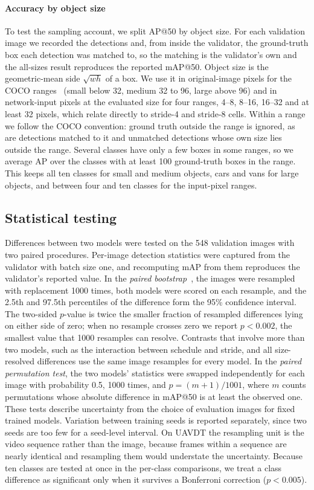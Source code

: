 \documentclass[preprint,12pt]{elsarticle}
\begin{document}
\paragraph{Accuracy by object size}
To test the sampling account, we split AP@50 by object size. For each validation
image we recorded the detections and, from inside the validator, the ground-truth
box each detection was matched to, so the matching is the validator's own and the
all-sizes result reproduces the reported mAP@50. Object size is the geometric-mean
side $\sqrt{wh}$ of a box. We use it in original-image pixels for the COCO
ranges~\cite{coco} (small below 32, medium 32 to 96, large above 96) and in
network-input pixels at the evaluated size for four ranges, 4--8, 8--16, 16--32 and
at least 32 pixels, which relate directly to stride-4 and stride-8 cells. Within a
range we follow the COCO convention: ground truth outside the range is ignored, as
are detections matched to it and unmatched detections whose own size lies outside
the range. Several classes have only a few boxes in some ranges, so we average AP
over the classes with at least 100 ground-truth boxes in the range. This keeps all
ten classes for small and medium objects, cars and vans for large objects, and
between four and ten classes for the input-pixel ranges.

\subsection{Statistical testing}
\label{sec:stats}

Differences between two models were tested on the 548 validation images with two
paired procedures. Per-image detection statistics were captured from the validator
with batch size one, and recomputing mAP from them reproduces the validator's
reported value. In the \emph{paired bootstrap}~\cite{efron1993bootstrap}, the
images were resampled with replacement 1000 times, both models were scored on each
resample, and the 2.5th and 97.5th percentiles of the difference form the 95\%
confidence interval. The two-sided $p$-value is twice the smaller fraction of
resampled differences lying on either side of zero; when no resample crosses zero
we report $p<0.002$, the smallest value that 1000 resamples can resolve. Contrasts
that involve more than two models, such as the interaction between schedule and
stride, and all size-resolved differences use the same image resamples for every
model. In the \emph{paired permutation test}, the two models'
statistics were swapped independently for each image with probability 0.5, 1000
times, and $p=(m+1)/1001$, where $m$ counts permutations whose absolute difference
in mAP@50 is at least the observed one. These tests describe uncertainty from the
choice of evaluation images for fixed trained models. Variation between training
seeds is reported separately, since two seeds are too few for a seed-level
interval. On UAVDT the resampling unit is the video sequence rather than the image,
because frames within a sequence are nearly identical and resampling them would
understate the uncertainty. Because ten classes are tested at once in the per-class comparisons, we
treat a class difference as significant only when it survives a Bonferroni
correction ($p<0.005$).
\end{document}
